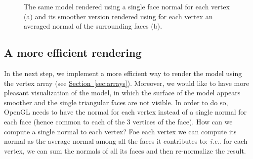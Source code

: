 \documentclass[a4paper,11pt]{article}
\makeatletter
\DeclareRobustCommand\onedot{\futurelet\@let@token\@onedot}
\def\@onedot{\ifx\@let@token.\else.\null\fi\xspace}
\def\ie{\emph{i.e}\onedot} \def\Ie{\emph{I.e}\onedot}
\newcommand{\brand}[1]{\textsf{#1}\xspace}
\newcommand{\opengl}{\brand{OpenGL}}
\newcommand{\sect}[1]{\hyperref[#1]{\mbox{Section \ref*{#1}}}\xspace}
\makeatother
\begin{document}
\begin{figure}
\begin{center}
\caption{The same model rendered using a single face normal for each vertex (a) and its smoother version rendered using for each vertex an averaged normal of the surrounding faces (b).}
\label{fig:cowflatsmooth}
\end{center}
\end{figure}


\subsection{A more efficient rendering}

In the next step, we implement a more efficient way to render the model using the vertex array (see \sect{sec:arrays}). Moreover, we would like to have more pleasant visualization of the model, in which the surface of the model appears smoother and the single triangular faces are not visible. In order to do so, \opengl needs to have the normal for each vertex instead of a single normal for each face (hence common to each of the 3 vertices of the face). How can we compute a single normal to each vertex? Foe each vertex we can compute its normal as the average normal among all the faces it contributes to: \ie for each vertex, we can sum the normals of all its faces and then re-normalize the result.
\end{document}
